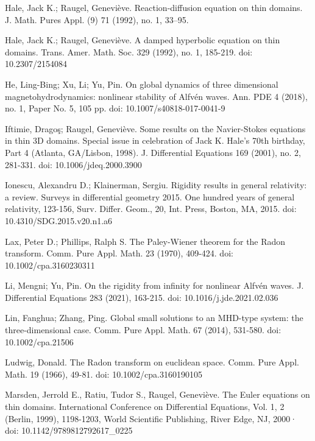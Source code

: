\documentclass[10pt,reqno]{amsart}
\numberwithin{equation}{section}
\begin{document}
\begin{thebibliography}{99}
	Hale, Jack K.; Raugel, Geneviève. Reaction-diffusion equation on thin domains. J. Math. Pures Appl. (9) 71 (1992), no. 1, 33–95.
	

	  Hale, Jack K.; Raugel, Geneviève. A damped hyperbolic equation on thin domains. Trans. Amer. Math. Soc. 329 (1992), no. 1, 185-219. doi: 10.2307/2154084
	
	
	  He, Ling-Bing; Xu, Li; Yu, Pin. On global dynamics of three dimensional magnetohydrodynamics: nonlinear stability of Alfv\'en waves. Ann. PDE 
	4 (2018), no. 1, Paper No. 5, 105 pp. doi: 10.1007/s40818-017-0041-9
	
	  Iftimie, Dragoş; Raugel, Geneviève. Some results on the Navier-Stokes equations in thin 3D domains. Special issue in celebration of Jack K. Hale's 70th birthday, Part 4 (Atlanta, GA/Lisbon, 1998). 
	 J. Differential Equations 169 (2001), no. 2, 281-331. doi: 10.1006/jdeq.2000.3900
	


 Ionescu, Alexandru D.; Klainerman, Sergiu. Rigidity results in general relativity: a review. Surveys in differential geometry 2015. One hundred years of general relativity, 123-156,
Surv. Differ. Geom., 20, Int. Press, Boston, MA, 2015. doi: 10.4310/SDG.2015.v20.n1.a6 

	 Lax, Peter D.; Phillips, Ralph S. The Paley-Wiener theorem for the Radon transform. Comm. Pure Appl. Math. 23 (1970), 409-424. doi: 10.1002/cpa.3160230311



	
		Li, Mengni; Yu, Pin. On the rigidity from infinity for nonlinear Alfv\'en waves. J. Differential Equations 283 (2021), 163-215. doi: 10.1016/j.jde.2021.02.036
	
	
	
	
	 Lin, Fanghua; Zhang, Ping. Global small solutions to an MHD-type system: the three-dimensional case. Comm. Pure Appl. Math.  67 (2014), 531-580. doi: 10.1002/cpa.21506
	
	 Ludwig, Donald. 
	The Radon transform on euclidean space. 
Comm. Pure Appl. Math. 19 (1966), 49-81.  doi: 10.1002/cpa.3160190105 


	
	 Marsden, Jerrold E., Ratiu, Tudor S., Raugel, Geneviève. The Euler equations on thin domains. International Conference on Differential Equations, Vol. 1, 2 (Berlin, 1999), 1198-1203, World Scientific Publishing, River Edge, NJ, 2000· doi: 10.1142/9789812792617\_0225
	


\end{thebibliography}
\end{document}
